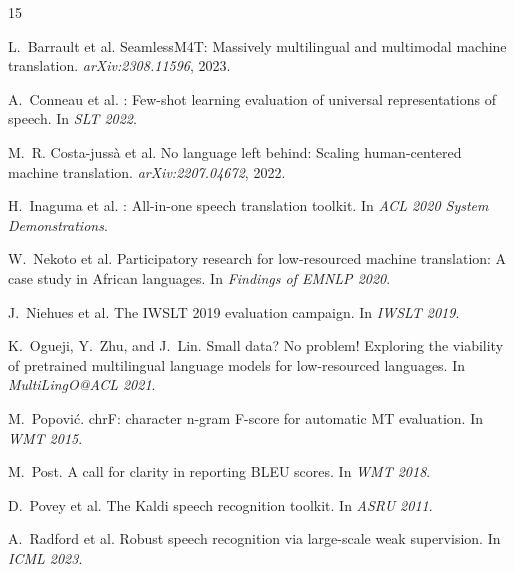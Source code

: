 \documentclass[11pt,a4paper]{article}
\begin{document}
\begin{thebibliography}{15}

L.~Barrault et al.
\newblock SeamlessM4T: Massively multilingual and multimodal machine translation.
\newblock \emph{arXiv:2308.11596}, 2023.

A.~Conneau et al.
: Few-shot learning evaluation of universal representations of speech.
\newblock In \emph{SLT 2022}.

M.~R. Costa-jussà et al.
\newblock No language left behind: Scaling human-centered machine translation.
\newblock \emph{arXiv:2207.04672}, 2022.

H.~Inaguma et al.
: All-in-one speech translation toolkit.
\newblock In \emph{ACL 2020 System Demonstrations}.

W.~Nekoto et al.
\newblock Participatory research for low-resourced machine translation: A case study in {A}frican languages.
\newblock In \emph{Findings of EMNLP 2020}.

J.~Niehues et al.
\newblock The {IWSLT} 2019 evaluation campaign.
\newblock In \emph{IWSLT 2019}.

K.~Ogueji, Y.~Zhu, and J.~Lin.
\newblock Small data? No problem! Exploring the viability of pretrained multilingual language models for low-resourced languages.
\newblock In \emph{MultiLingO@ACL 2021}.

M.~Popović.
\newblock chr{F}: character n-gram {F}-score for automatic {MT} evaluation.
\newblock In \emph{WMT 2015}.

M.~Post.
\newblock A call for clarity in reporting {BLEU} scores.
\newblock In \emph{WMT 2018}.

D.~Povey et al.
\newblock The {Kaldi} speech recognition toolkit.
\newblock In \emph{ASRU 2011}.

A.~Radford et al.
\newblock Robust speech recognition via large-scale weak supervision.
\newblock In \emph{ICML 2023}.

\end{thebibliography}
\end{document}
